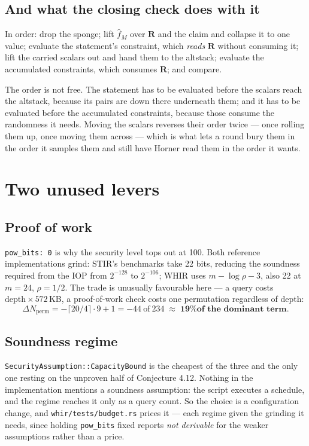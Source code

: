 \documentclass[11pt,a4paper]{article}
\begin{document}
\subsection*{And what the closing check does with it}

In order: drop the sponge; lift $\hat f_{M}$ over $\boldsymbol R$ and the claim and collapse it to one
value; evaluate the statement's constraint, which \emph{reads} $\boldsymbol R$ without consuming it;
lift the carried scalars out and hand them to the altstack; evaluate the accumulated constraints,
which consumes $\boldsymbol R$; and compare.

The order is not free. The statement has to be evaluated before the scalars reach the altstack,
because its pairs are down there underneath them; and it has to be evaluated before the accumulated
constraints, because those consume the randomness it needs. Moving the scalars reverses their order
twice --- once rolling them up, once moving them across --- which is what lets a round bury them in
the order it samples them and still have Horner read them in the order it wants.

\section{Two unused levers}\label{sec:levers}

\subsection*{Proof of work}
\texttt{pow\_bits: 0} is why the security level tops out at 100. Both reference implementations
grind: STIR's benchmarks take 22 bits, reducing the soundness required from the IOP from $2^{-128}$
to $2^{-106}$; WHIR uses $m-\log\rho-3$, also 22 at $m=24$, $\rho=1/2$. The trade is unusually
favourable here --- a query costs $\mathrm{depth}\times572$\,KB, a proof-of-work check costs one
permutation regardless of depth:
\[
  \Delta N_{\mathrm{perm}} = -\lceil20/4\rceil\cdot9 + 1 = -44 \ \text{of}\ 234
  \;\approx\; \textbf{19\% of the dominant term}.
\]

\subsection*{Soundness regime}
\texttt{SecurityAssumption::CapacityBound} is the cheapest of the three and the only one resting on
the unproven half of Conjecture 4.12. Nothing in the implementation mentions a soundness assumption:
the script executes a schedule, and the regime reaches it only as a query count. So the choice is a
configuration change, and \texttt{whir/tests/budget.rs} prices it --- each regime given the grinding
it needs, since holding \texttt{pow\_bits} fixed reports \emph{not derivable} for the weaker
assumptions rather than a price.
\end{document}
